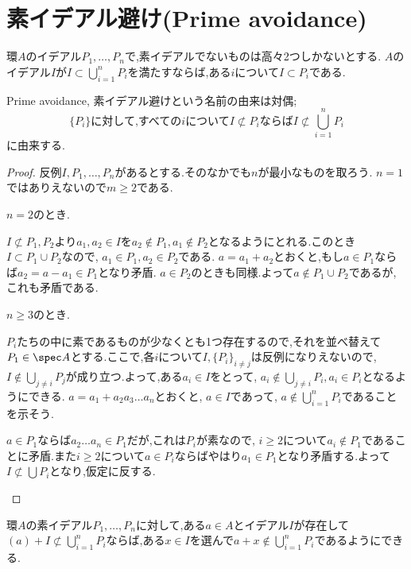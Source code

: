 \section{素イデアル避け(Prime avoidance)}

\begin{lem}\label{lem:Prime avoidance}
	環$A$のイデアル$P_1,\dots, P_n$で,素イデアルでないものは高々2つしかないとする. $A$のイデアル$I$が$I\subset\bigcup_{i=1}^n P_i$を満たすならば,ある$i$について$I\subset P_i$である.
\end{lem}

Prime avoidance, 素イデアル避けという名前の由来は対偶;
\[\{P_i\}\text{に対して,すべての}i\text{について}I\not\subset P_i\text{ならば}I\not\subset\bigcup_{i=1}^n P_i\]
に由来する.
\begin{proof}
	反例$I,P_1,\dots, P_n$があるとする.そのなかでも$n$が最小なものを取ろう. $n=1$ではありえないので$m\geq 2$である.
	
	\begin{sakura}
		\item $n=2$のとき.
		
		$I\not\subset P_1,P_2$より$a_1,a_2\in I$を$a_2\not\in P_1,a_1\not\in P_2$となるようにとれる.このとき$I\subset P_1\cup P_2$なので, $a_1\in P_1,a_2\in P_2$である. $a=a_1+a_2$とおくと,もし$a\in P_1$ならば$a_2=a-a_1\in P_1$となり矛盾. $a\in P_2$のときも同様.よって$a\not\in P_1\cup P_2$であるが,これも矛盾である.
		
		\item $n\geq3$のとき.
		
		$P_i$たちの中に素であるものが少なくとも1つ存在するので,それを並べ替えて$P_1\in\spec A$とする.ここで,各$i$について$I,\{P_i\}_{i\neq j}$は反例になりえないので, $I\not\in\bigcup_{j\neq i}P_j$が成り立つ.よって,ある$a_i\in I$をとって, $a_i\not\in\bigcup_{j\neq i}P_i,a_i\in P_i$となるようにできる. $a=a_1+a_2a_3\dots a_n$とおくと, $a\in I$であって, $a\not\in\bigcup_{i=1}^n P_i$であることを示そう.
		
		$a\in P_1$ならば$a_2\dots a_n\in P_1$だが,これは$P_i$が素なので, $i\geq2$について$a_i\not\in P_1$であることに矛盾.また$i\geq2$について$a\in P_i$ならばやはり$a_1\in P_1$となり矛盾する.よって$I\not\subset\bigcup P_i$となり,仮定に反する.
	\end{sakura}
\end{proof}

\begin{thm}[Davisの補題]\label{thm:Davisの補題}
	環$A$の素イデアル$P_1,\dots,P_n$に対して,ある$a\in A$とイデアル$I$が存在して$(a)+I\not\subset\bigcup_{i=1}^n P_i$ならば,ある$x\in I$を選んで$a+x\not\in\bigcup_{i=1}^n P_i$であるようにできる.
\end{thm}

